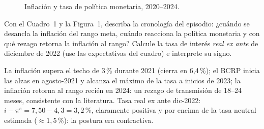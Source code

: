 \documentclass{evaluacion}
\begin{document}
\begin{figure}[h]
\centering
{}
\caption{Inflación y tasa de política monetaria, 2020--2024.}
\end{figure}

\begin{pregunta}
Con el Cuadro~1 y la Figura~1, describa la cronología del episodio:
¿cuándo se desancla la inflación del rango meta, cuándo reacciona la
política monetaria y con qué rezago retorna la inflación al rango?
Calcule la tasa de interés \emph{real ex ante} de diciembre de 2022
(use las expectativas del cuadro) e interprete su signo.
\begin{solucion}
La inflación supera el techo de 3\,\% durante 2021 (cierra en 6,4\,\%);
el BCRP inicia las alzas en agosto-2021 y alcanza el máximo de la tasa a
inicios de 2023; la inflación retorna al rango recién en 2024: un rezago
de transmisión de 18--24 meses, consistente con la literatura. Tasa real
ex ante dic-2022: $i - \pi^{e} = 7{,}50 - 4{,}3 = 3{,}2\,\%$, claramente
positiva y por encima de la tasa neutral estimada ($\approx 1{,}5\,\%$):
la postura era contractiva.
\end{solucion}
\end{pregunta}
\end{document}
